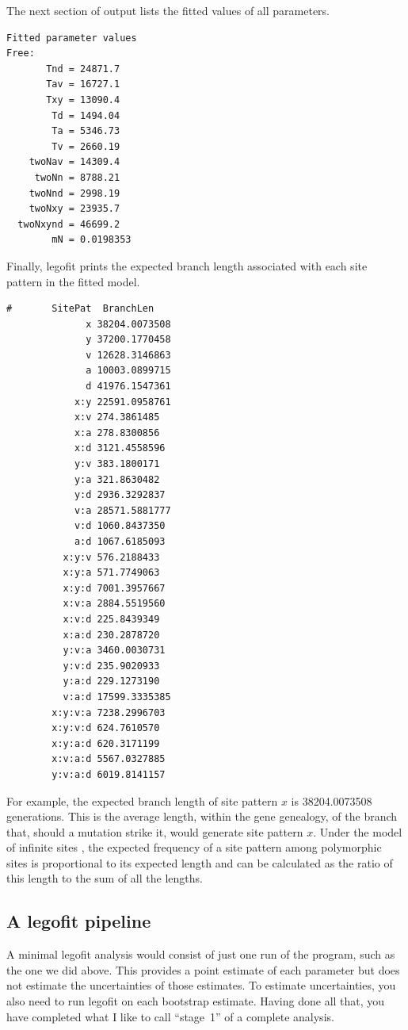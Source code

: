 \documentclass[11pt]{article}
\begin{document}
The next section of output lists the fitted values of all parameters.
\begin{verbatim}
Fitted parameter values
Free:
       Tnd = 24871.7
       Tav = 16727.1
       Txy = 13090.4
        Td = 1494.04
        Ta = 5346.73
        Tv = 2660.19
    twoNav = 14309.4
     twoNn = 8788.21
    twoNnd = 2998.19
    twoNxy = 23935.7
  twoNxynd = 46699.2
        mN = 0.0198353
\end{verbatim}
Finally, legofit prints the expected branch length associated with
each site pattern in the fitted model.
\begin{verbatim}
#       SitePat  BranchLen
              x 38204.0073508
              y 37200.1770458
              v 12628.3146863
              a 10003.0899715
              d 41976.1547361
            x:y 22591.0958761
            x:v 274.3861485
            x:a 278.8300856
            x:d 3121.4558596
            y:v 383.1800171
            y:a 321.8630482
            y:d 2936.3292837
            v:a 28571.5881777
            v:d 1060.8437350
            a:d 1067.6185093
          x:y:v 576.2188433
          x:y:a 571.7749063
          x:y:d 7001.3957667
          x:v:a 2884.5519560
          x:v:d 225.8439349
          x:a:d 230.2878720
          y:v:a 3460.0030731
          y:v:d 235.9020933
          y:a:d 229.1273190
          v:a:d 17599.3335385
        x:y:v:a 7238.2996703
        x:y:v:d 624.7610570
        x:y:a:d 620.3171199
        x:v:a:d 5567.0327885
        y:v:a:d 6019.8141157
\end{verbatim}
For example, the expected branch length of site pattern $x$ is
38204.0073508 generations. This is the average length, within the gene
genealogy, of the branch that, should a mutation strike it, would
generate site pattern $x$. Under the model of infinite sites
\citep{Kimura:InfiniteSites}, the expected frequency of a site pattern
among polymorphic sites is proportional to its expected length and can
be calculated as the ratio of this length to the sum of all the
lengths.

\subsection{A legofit pipeline}
\label{sec.pipeline}
A minimal legofit analysis would consist of just one run of the
program, such as the one we did above. This provides a point estimate
of each parameter but does not estimate the uncertainties of those
estimates. To estimate uncertainties, you also need to run legofit on
each bootstrap estimate. Having done all that, you have completed what
I like to call ``stage~1'' of a complete analysis.
\end{document}

